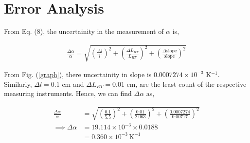\section{Error Analysis}

From Eq. (8), the uncertainity in the measurement of $\alpha$ is,

\begin{align}
    \frac{\Delta \alpha}{\alpha} = \sqrt{\left(\frac{\Delta l}{l}\right)^2 + \left(\frac{\Delta L_{RT}}{L_{RT}}\right)^2 + \left(\frac{\Delta \text{slope}}{\text{slope}}\right)^2}
\end{align}

From Fig. (\ref{graph}), there uncertainity in slope is $0.0007274 \times 10^{-3}$ K$^{-1}$. Similarly, $\Delta l = 0.1$ cm and $\Delta L_{RT} = 0.01$ cm, are the least count of the respective measuring instruments. Hence, we can find $\Delta \alpha$ as,

\begin{align*}
    \frac{\Delta \alpha}{\alpha} &= \sqrt{\left(\frac{0.1}{5.5}\right)^2 + \left(\frac{0.01}{2.063}\right)^2 + \left(\frac{0.0007274}{\text{0.00717}}\right)^2}\\
    \implies \Delta \alpha &= 19.114 \times 10^{-3} \times 0.0188\\
    &= 0.360 \times 10^{-3}\,\text{K}^{-1} 
\end{align*}